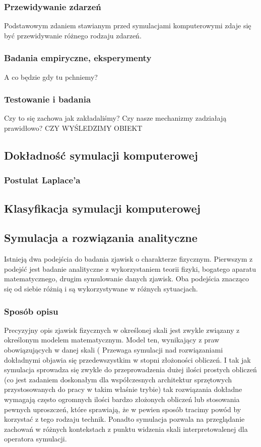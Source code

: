 \subsubsection{Przewidywanie zdarzeń}
Podstawowym zdaniem stawianym przed symulacjami komputerowymi zdaje się być przewidywanie różnego rodzaju zdarzeń.

\subsubsection{Badania empiryczne, eksperymenty}
A co będzie gdy tu pchniemy?

\subsubsection{Testowanie i badania}
Czy to się zachowa jak zakładaliśmy?
Czy nasze mechanizmy zadziałają prawidłowo?
CZY WYŚLEDZIMY OBIEKT

\subsection{Dokładność symulacji komputerowej}
\subsubsection{Postulat Laplace'a}
\subsection{Klasyfikacja symulacji komputerowej}
\subsection{Symulacja a rozwiązania analityczne}
Istnieją dwa podejścia do badania zjawisk o charakterze fizycznym.
Pierwszym z podejść jest badanie analityczne z wykorzystaniem teorii fizyki, bogatego aparatu matematycznego, drugim symulowanie danych zjawisk.
Oba podejścia znacząco się od siebie różnią i są wykorzystywane w różnych sytuacjach.

\subsubsection{Sposób opisu}
Precyzyjny opis zjawisk fizycznych w określonej skali jest zwykle związany z określonym modelem matematycznym. Model ten, wynikający z praw obowiązujących w danej skali (
Przewaga symulacji nad rozwiązaniami dokładnymi objawia się przedewszystkim w stopni złożoności obliczeń. I tak jak symulacja sprowadza się zwykle do przeprowadzenia dużej ilości prostych obliczeń (co jest zadaniem doskonałym dla współczesnych architektur sprzętowych przystosowanych do pracy w takim właśnie trybie) tak rozwiązania dokładne wymagają często ogromnych ilości bardzo złożonych obliczeń lub stosowania pewnych uproszczeń, które sprawiają, że w pewien sposób tracimy powód by korzystać z tego rodzaju technik.
Ponadto symulacja pozwala na przeglądanie zachowań w różnych kontekstach z punktu widzenia skali interpretowalenej dla operatora symulacji.

